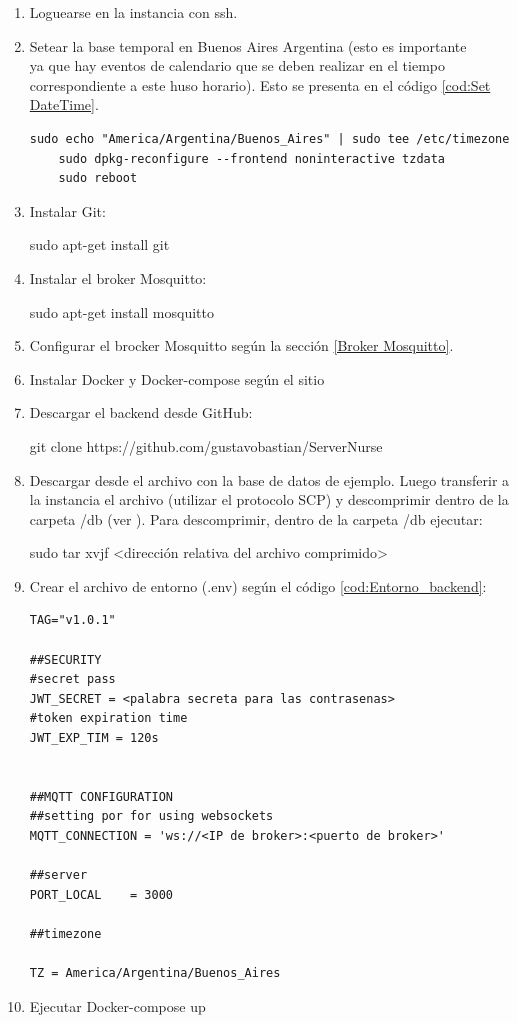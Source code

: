 \begin{enumerate}


\item Loguearse en la instancia con ssh.
\item Setear la base temporal en Buenos Aires Argentina (esto es importante \\ ya que hay eventos de calendario que se deben realizar en el tiempo correspondiente a este huso horario). Esto se presenta en el código \ref{cod:Set DateTime}.\\

\begin{lstlisting}[label=cod:Set DateTime,caption=  Configuración de zona horaria.]
	sudo echo "America/Argentina/Buenos_Aires" | sudo tee /etc/timezone
	sudo dpkg-reconfigure --frontend noninteractive tzdata
	sudo reboot
\end{lstlisting}

\item Instalar Git:

	sudo apt-get install git
\item Instalar el broker Mosquitto:
	
	sudo apt-get install mosquitto
\item Configurar el brocker Mosquitto según la sección \ref{Broker Mosquitto}.
\item Instalar Docker y Docker-compose según el sitio \citep{WEBSITE:8}
\item Descargar el backend desde GitHub:

	git clone  https://github.com/gustavobastian/ServerNurse
\item Descargar desde \citep{WEBSITE:44} el archivo con la base de datos de ejemplo. Luego transferir a la instancia el archivo (utilizar el protocolo SCP)  y descomprimir dentro de la carpeta /db (ver \citep{WEBSITE:43}). Para descomprimir, dentro de la carpeta /db ejecutar:

sudo tar xvjf <dirección relativa del archivo comprimido>


\pagebreak
\item Crear el archivo de entorno (.env) según el código \ref{cod:Entorno_backend}:


\begin{lstlisting}[label=cod:Entorno_backend,caption=  Entorno del backend.]
TAG="v1.0.1"

##SECURITY
#secret pass
JWT_SECRET = <palabra secreta para las contrasenas>
#token expiration time
JWT_EXP_TIM = 120s


##MQTT CONFIGURATION
##setting por for using websockets
MQTT_CONNECTION = 'ws://<IP de broker>:<puerto de broker>'

##server
PORT_LOCAL    = 3000

##timezone

TZ = America/Argentina/Buenos_Aires 
\end{lstlisting}


\item Ejecutar Docker-compose up
\end{enumerate}

